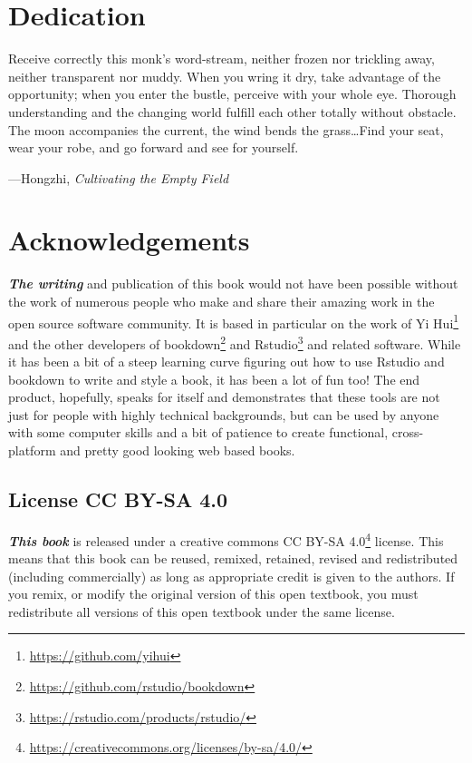\documentclass[]{book}
\renewcommand{\href}[2]{#2\footnote{\url{#1}}}
\newenvironment{epigraph}%
{
\begin{flushright}
\begin{minipage}{20em}
\begin{flushright}
\itshape
}%
{
\end{flushright}
\end{minipage}
\end{flushright}
\vspace{1em}
}
\begin{document}
\hypertarget{dedication}{%
\section*{Dedication}\label{dedication}}


\begin{epigraph}
Receive correctly this monk's word-stream, neither frozen nor trickling
away, neither transparent nor muddy. When you wring it dry, take
advantage of the opportunity; when you enter the bustle, perceive with
your whole eye. Thorough understanding and the changing world fulfill
each other totally without obstacle. The moon accompanies the current,
the wind bends the grass\ldots{}Find your seat, wear your robe, and go
forward and see for yourself.

---Hongzhi, \emph{Cultivating the Empty Field}
\end{epigraph}

\hypertarget{acknowledgements}{%
\section*{Acknowledgements}\label{acknowledgements}}


\textbf{\emph{The writing}} and publication of this book would not have been possible without the work of numerous people who make and share their amazing work in the open source software community. It is based in particular on the work of \href{https://github.com/yihui}{Yi Hui} and the other developers of \href{https://github.com/rstudio/bookdown}{bookdown} and \href{https://rstudio.com/products/rstudio/}{Rstudio} and related software. While it has been a bit of a steep learning curve figuring out how to use Rstudio and bookdown to write and style a book, it has been a lot of fun too! The end product, hopefully, speaks for itself and demonstrates that these tools are not just for people with highly technical backgrounds, but can be used by anyone with some computer skills and a bit of patience to create functional, cross-platform and pretty good looking web based books.

\hypertarget{license-cc-by-sa-4.0}{%
\subsection*{License CC BY-SA 4.0}\label{license-cc-by-sa-4.0}}


\textbf{\emph{This book}} is released under a creative commons \href{https://creativecommons.org/licenses/by-sa/4.0/}{CC BY-SA 4.0} license. This means that this book can be reused, remixed, retained, revised and redistributed (including commercially) as long as appropriate credit is given to the authors. If you remix, or modify the original version of this open textbook, you must redistribute all versions of this open textbook under the same license.
\end{document}
